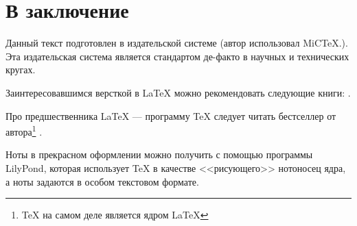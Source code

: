 \chapter*{В заключение}


Данный текст подготовлен в издательской системе {\LaTeXe} (автор использовал MiC\TeX.). Эта издательская система является стандартом де-факто в научных и технических кругах.

Заинтересовавшимся версткой в {\LaTeX} можно рекомендовать следующие книги: \cite{bib:cotelnikov,bib:baldin}.

Про предшественника {\LaTeX} --- программу {\TeX} следует читать бестселлер от автора\footnote{{\TeX} на самом деле является ядром \LaTeX} \cite{bib:knuth:AllAbout}.

Ноты в прекрасном оформлении можно получить с помощью программы LilyPond, которая использует {\TeX} в качестве <<рисующего>> нотоносец ядра, а ноты задаются в особом текстовом формате.
